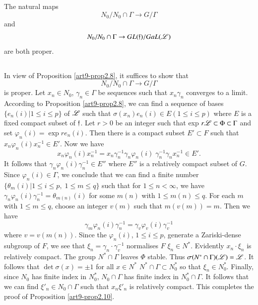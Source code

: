 \setcounter{definition}{9}
\begin{proposition}\label{art9-prop2.10}
The natural maps 
$$
N_0 / N_0 \cap \Gamma \to G / \Gamma
$$
and\pageoriginale
$$
N_0 / N_0 \cap \Gamma \to G L (\mathfrak{f}) /  Ga L (\mathscr{L})
$$
are both proper.
\end{proposition}

\setcounter{subsection}{10}
\subsection{}\label{art9-subsec2.11}
In view of Proposition \ref{art9-prop2.8}, it suffices to show that
$$
N_0/ N_0 \cap \Gamma \to G / \Gamma
$$
is proper. Let $x_n \in N_0$, $\gamma_n \in \Gamma$ be sequences such that $x_n \gamma_n$ converges to a limit. According to Proposition \ref{art9-prop2.8}, we can find a sequence of bases $\{e_n(i) \big| 1 \leqslant i \leqslant p \}$ of $\mathscr{L}$ such that $\sigma (x_n) e_n (i) \in E (1 \leqslant i \leqslant p)$ where $E$ is a fixed compact subset of $\mathfrak{f}$. Let $r > 0$ be an integer such that exp $r \mathscr{L} \subset \Phi \subset \Gamma$ and set $\varphi_n (i) =\exp r e_n (i)$. Then there is a compact subset $E' \subset F$ such that $x_n \varphi_n (i) x^{-1}_n \in E'$. Now we have
$$
x_n \varphi_n (i) x^{-1}_n = x_n \gamma^{-1}_n \gamma_n \varphi_n (i) \; \gamma^{-1}_n \gamma_n x^{-1}_n \in E'.
$$
It follows that $\gamma_n \varphi_n(i) \gamma^{-1}_n \in E''$ where $E''$ is a relatively compact subset of $G$. Since $\varphi_n(i) \in \Gamma$, we conclude that we can find a finite number $\{\theta_m (i) \big| 1 \leqslant i \leqslant p, \; 1 \leqslant m \leqslant q\}$ such that for $1 \leqslant n < \infty$, we have $\gamma_n \varphi_n(i) \gamma^{-1}_n = \theta_{m(n)} (i)$ for some $m(n)$ with $1 \leqslant m (n) \leqslant q$. For each $m$ with $1 \leqslant m \leqslant q$, choose an integer $v(m)$ such that $m(v(m)) = m$. Then we have
$$
\gamma_m \varphi_n (i) \gamma^{-1}_n = \gamma_v \varphi_v (i) \gamma^{-1}_v
$$
where $v = v (m(n))$. Since the $\varphi_n (i)$, $1 \leqslant i \leqslant p$, generate a Zariski-dense subgroup of $F$, we see that $\xi_n = \gamma_n \cdot \gamma^{-1}_v$ normalises $F$ \ie $\xi_n \in N^\ast$. Evidently $x_n \cdot \xi_n$ is relatively compact. The group $N^\ast \cap \Gamma$ leaves $\Phi$ stable. Thus $\sigma (N^\ast \cap \Gamma) (\mathscr{L}) = \mathscr{L}$. It follows that $\det \sigma (x) = \pm 1$ for all  $x \in N^\ast$ \ie $N^\ast \cap \Gamma \subset N^\ast_0$  so that $\xi_n \in N^\ast_0$. Finally, since $N_0$ has finite index in $N^\ast_0$, $N_0 \cap \Gamma$ has finite index in $N^\ast_0 \cap \Gamma$. It follows that we can find $\xi'_n \in N_0 \cap \Gamma$ such that $x_n \xi'_n$ is relatively compact. This completes the proof of Proposition \ref{art9-prop2.10}.

